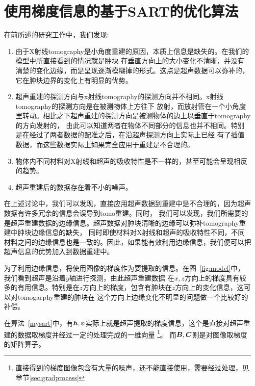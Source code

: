 \section{使用梯度信息的基于SART的优化算法}\label{sec:mysart}
在前所述的研究工作中，我们发现:
\begin{enumerate}
    \item 由于X射线tomography是小角度重建的原因，本质上信息是缺失的。在我们的模型中所直接看到的情况就是肿块
    在垂直方向上的大小变化不清晰，并没有清楚的变化边缘，而是呈现逐渐模糊掉的形式。这点是超声数据可以弥补的，
    它在肿块边界的变化上有明显的优势。
    \item 超声重建的探测方向与x射线tomography的探测方向并不相同。x射线tomography的探测方向是在被测物体上方往下
    放射，而放射管在一个小角度里转动。相比之下超声重建的探测方向是被测物体的边上以垂直于tomography的方向发射的，
    由此可以知道两者在物体不同部分的信息也并不相同。特别是在经过了两者数据的配准之后，在沿超声探测方向上实际上已经
    有了插值数据，而这些数据实际上如果完全应用于重建是不合理的。
    \item 物体内不同材料对X射线和超声的吸收特性是不一样的，甚至可能会呈现相反的趋势。
    \item 超声重建后的数据存在着不小的噪声。
\end{enumerate}
在上述讨论中，我们可以发现，直接应用超声数据到重建中是不合理的，因为超声数据有许多冗余的信息会误导到tomo重建。同时，
我们可以发现，我们所需要的是超声重建数据的边缘信息。超声数据对肿块清晰的边缘可以弥补tomography重建中肿块边缘信息的缺失，
同时即使材料对X射线和超声的吸收特性不同，不同材料之间的边缘信息也是一致的。因此，如果能有效利用边缘信息，我们便可以把
超声信息的优势加入到数据重建中。

为了利用边缘信息，将使用图像的梯度作为要提取的信息。在图~\ref{fig:model}中，我们看到超声是沿着$y$轴进行探测，由此超声重建数据
在$x,z$方向上的梯度具有较多的有用信息。特别是在$z$方向上的梯度，包含有肿块在$z$方向上的变化信息，这可以对tomogarphy重建的肿块在
这个方向上边缘变化不明显的问题做一个比较好的补偿。

在算法~\ref{mysart}中，有$\bm{h},\bm{v}$实际上就是超声提取的梯度信息，这个是直接对超声重建的数据取梯度并经过一定的处理完成的一维向量
\footnote{直接得到的梯度图像包含有大量的噪声，还不能直接使用，需要经过处理，见章节\ref{sec:gradprocess}}。
而$\bm{B},\bm{C} $则是对图像取梯度的矩阵算子。

